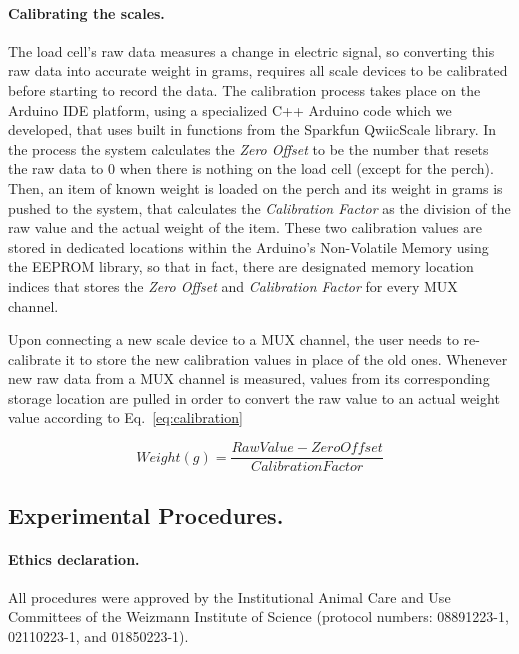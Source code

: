 \documentclass{article}
\begin{document}
\paragraph{Calibrating the scales.} The load cell’s raw data measures a change in electric signal, so converting this raw data into accurate weight in grams, requires all scale devices to be calibrated before starting to record the data.
The calibration process takes place on the Arduino IDE platform, using a specialized C++ Arduino code which we developed, that uses built in functions from the Sparkfun QwiicScale library. In the process the system calculates the \textit{Zero Offset} to be the number that resets the raw data to 0 when there is nothing on the load cell (except for the perch). Then, an item of known weight is loaded on the perch and its weight in grams is pushed to the system, that calculates the \textit{Calibration Factor} as the division of the raw value and the actual weight of the item. These two calibration values are stored in dedicated locations within the Arduino’s Non-Volatile Memory using the EEPROM library, so that in fact, there are designated memory location indices that stores the \textit{Zero Offset }and \textit{Calibration Factor} for every MUX channel. 

Upon connecting a new scale device to a MUX channel, the user needs to re-calibrate it to store the new calibration values in place of the old ones. Whenever new raw data from a MUX channel is measured, values from its corresponding storage location are pulled in order to convert the raw value to an actual weight value according to Eq.~\ref{eq:calibration} 

\begin{equation} \label{eq:calibration}
    Weight(g)=\frac{Raw Value-Zero Offset}{Calibration Factor}
\end{equation}
 
\subsection{Experimental Procedures.} 

\paragraph{Ethics declaration.}
All procedures were approved by the 
Institutional Animal Care and Use Committees of the Weizmann Institute of Science (protocol numbers: 08891223-1, 02110223-1, and 01850223-1).
\end{document}
